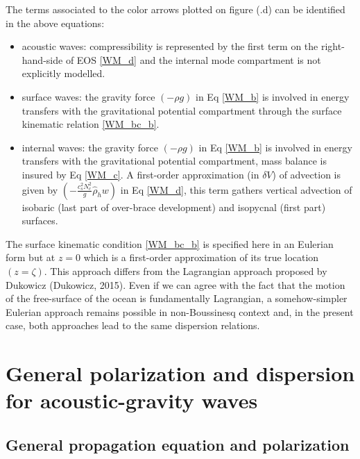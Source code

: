 \documentclass[a4paper,11pt]{article}
\begin{document}
The terms associated to the color arrows plotted on figure (.d) can be identified in the above equations:
\begin{itemize}
	\item acoustic waves: compressibility is represented by the first term on the right-hand-side of EOS \ref{WM_d} and the internal mode compartment is not explicitly modelled.
	\item surface waves: the gravity force $(-\rho g)$ in Eq \ref{WM_b} is involved in energy transfers with the gravitational potential compartment through the surface kinematic relation \ref{WM_bc_b}.
	\item internal waves: the gravity force $(-\rho g)$ in Eq \ref{WM_b} is involved in energy transfers with the gravitational potential compartment, mass balance is insured by Eq \ref{WM_c}. A first-order approximation (in $\delta V$) of advection is given by $(-\frac{c_s^2 N_c^2}{g} \hat{\rho}_h w)$ in Eq \ref{WM_d}, this term gathers vertical advection of isobaric (last part of over-brace development) and isopycnal (first part) surfaces.
\end{itemize}
The surface kinematic condition \ref{WM_bc_b} is specified here in an Eulerian form but at $z=0$ which is a first-order approximation of its true location $(z=\zeta)$. This approach differs from the Lagrangian approach proposed by Dukowicz (Dukowicz, 2015). Even if we can agree with the fact that the motion of the free-surface of the ocean is fundamentally Lagrangian, a somehow-simpler Eulerian approach remains possible in non-Boussinesq context and, in the present case, both approaches lead to the same dispersion relations.

\newpage
\section{General polarization and dispersion for acoustic-gravity waves}
\label{SectionDisp}
\subsection{General propagation equation and polarization}
\end{document}
